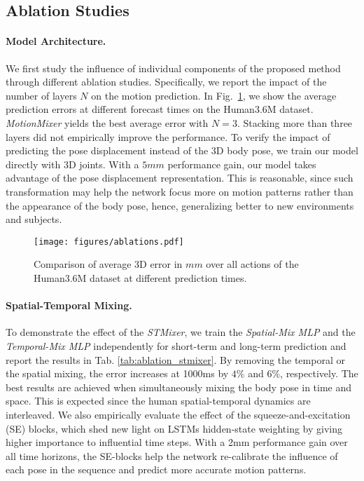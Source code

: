 \documentclass{article}
\begin{document}
\subsection{Ablation Studies}



\paragraph{Model Architecture.}
We first study the influence of individual components of the proposed method through different ablation studies. Specifically, we report the impact of the number of layers $N$ on the motion prediction. In Fig.~\ref{fig:ablation}, we show the average prediction errors at different forecast times on the Human3.6M dataset. \textit{MotionMixer} yields the best average error with $N = 3$. Stacking more than three layers did not empirically improve the performance. To verify the impact of predicting the pose displacement instead of the 3D body pose, we train our model directly with 3D joints. With a $5mm$ performance gain, our model takes advantage of the pose displacement representation. This is reasonable, since such transformation may help the network focus more on motion patterns rather than the appearance of the body pose, hence, generalizing better to new environments and subjects.

\begin{figure} [ht] 
    \centering
    \vspace{-0.1in}
    \texttt{[image: figures/ablations.pdf]}
    \caption{Comparison of average 3D error in $mm$ over all actions of the Human3.6M dataset at different prediction times.}
    \label{fig:ablation}
\end{figure}


\paragraph{Spatial-Temporal Mixing.} To demonstrate the effect of the \textit{STMixer}, we train the \textit{Spatial-Mix MLP} and the \textit{Temporal-Mix MLP} independently for short-term and long-term prediction and report the results in Tab. \ref{tab:ablation_stmixer}. By removing the temporal or the spatial mixing, the error increases at 1000ms by $4\%$ and $6\%$, respectively. The best results are achieved when simultaneously mixing the body pose in time and space. This is expected since the human spatial-temporal dynamics are interleaved. We also empirically evaluate the effect of the squeeze-and-excitation (SE) blocks, which shed new light on LSTMs hidden-state weighting by giving higher importance to influential time steps. With a 2mm performance gain over all time horizons, the SE-blocks help the network re-calibrate the influence of each pose in the sequence and predict more accurate motion patterns. 
\end{document}
